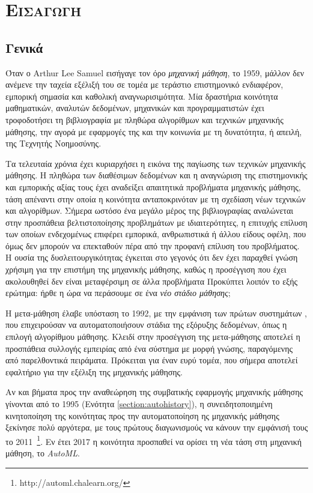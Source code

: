 \chapter{\scshape{Εισαγωγή}}
\section{Γενικά}
Όταν ο Arthur Lee Samuel εισήγαγε τον όρο \textit{μηχανική μάθηση}, το 1959, μάλλον δεν ανέμενε την ταχεία εξέλιξή του σε τομέα με τεράστιο επιστημονικό ενδιαφέρον, εμπορική σημασία και καθολική αναγνωρισιμότητα. Μία δραστήρια κοινότητα μαθηματικών, αναλυτών δεδομένων, μηχανικών και προγραμματιστών έχει τροφοδοτήσει τη βιβλιογραφία με πληθώρα αλγορίθμων και τεχνικών μηχανικής μάθησης, την αγορά με εφαρμογές της και την κοινωνία με τη δυνατότητα, ή απειλή, της Τεχνητής Νοημοσύνης.

Τα τελευταία χρόνια έχει κυριαρχήσει η εικόνα της παγίωσης των τεχνικών μηχανικής μάθησης. Η πληθώρα των διαθέσιμων δεδομένων και η αναγνώριση της επιστημονικής και εμπορικής αξίας τους έχει αναδείξει απαιτητικά προβλήματα μηχανικής μάθησης, τάση απέναντι στην οποία η κοινότητα ανταποκρινόταν με τη σχεδίαση νέων τεχνικών και αλγορίθμων. Σήμερα ωστόσο ένα μεγάλο μέρος της βιβλιογραφίας αναλώνεται στην προσπάθεια βελτιστοποίησης προβλημάτων με ιδιαιτερότητες, η επιτυχής επίλυση των οποίων ενδεχομένως επιφέρει εμπορικά, ανθρωπιστικά ή άλλου είδους οφέλη, που όμως δεν μπορούν να επεκταθούν πέρα από την προφανή επίλυση του προβλήματος. Η ουσία της δυσλειτουργικότητας έγκειται στο γεγονός ότι δεν έχει παραχθεί γνώση χρήσιμη για την επιστήμη της μηχανικής μάθησης, καθώς η προσέγγιση που έχει ακολουθηθεί δεν είναι μεταφέρσιμη σε άλλα προβλήματα Προκύπτει λοιπόν το εξής ερώτημα: ήρθε η ώρα να περάσουμε σε ένα \textit{νέο στάδιο μάθησης};

Η μετα-μάθηση έλαβε υπόσταση το 1992, με την εμφάνιση των πρώτων συστημάτων \citep{craw1993,Brazdil1994}, που επιχειρούσαν να αυτοματοποιήσουν στάδια της εξόρυξης δεδομένων, όπως η επιλογή αλγορίθμου μάθησης. Κλειδί στην προσέγγιση της μετα-μάθησης αποτελεί η προσπάθεια συλλογής εμπειρίας από ένα σύστημα με μορφή γνώσης, παραγόμενης από παρελθοντικά πειράματα. Πρόκειται για έναν ευρύ τομέα, που σήμερα αποτελεί εφαλτήριο για την εξέλιξη της μηχανικής μάθησης.


Αν και βήματα προς την αναθεώρηση της συμβατικής εφαρμογής μηχανικής μάθησης γίνονται από το 1995 (Ενότητα \ref{section:autohistory}), η συνειδητοποιημένη κινητοποίηση της κοινότητας προς την αυτοματοποίηση ης μηχανικής μάθησης ξεκίνησε πολύ αργότερα, με τους πρώτους διαγωνισμούς να κάνουν την εμφάνισή τους το 2011~\footnote{http://automl.chalearn.org/}. Εν έτει 2017 η κοινότητα προσπαθεί να ορίσει τη νέα τάση στη μηχανική μάθηση, το \textit{AutoML}.

